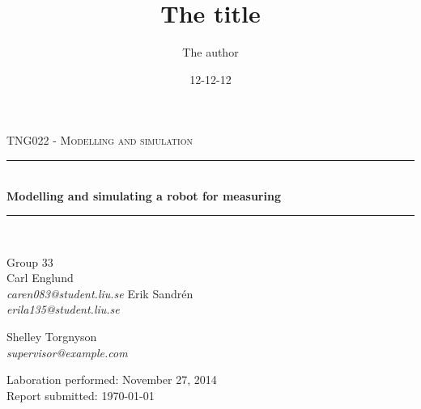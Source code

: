 \documentclass[12pt,a4paper]{article}
\newcommand{\HRule}{\rule{\linewidth}{0.5mm}}
\begin{document}
\title{The title}
\author{The author}
\date{12-12-12}

\begin{titlepage}
\begin{center}

\textsc{TNG022 - Modelling and simulation }\\[0.5cm]

\HRule \\[0.4cm]
{ \huge \bfseries Modelling and simulating a robot for measuring \\[0.4cm] }

\HRule \\[1.5cm]

\begin{minipage}{0.4\textwidth}
\begin{flushleft} \large
Group 33\\
Carl Englund\\
\emph{caren083@student.liu.se}
Erik Sandrén\\
\emph{erila135@student.liu.se}
\end{flushleft}
\end{minipage}
\begin{minipage}{0.4\textwidth}
\begin{flushright} \large
Shelley Torgnyson\\
\emph{supervisor@example.com}
\end{flushright}
\end{minipage}

\vfill

{\large Laboration performed: November 27, 2014\\}
{\large Report submitted: \today}

\end{center}
\end{titlepage}

\newpage\null\thispagestyle{empty}\newpage

\newpage{} %

\begin{abstract}
\lipsum[4]
\end{abstract}
\end{document}
